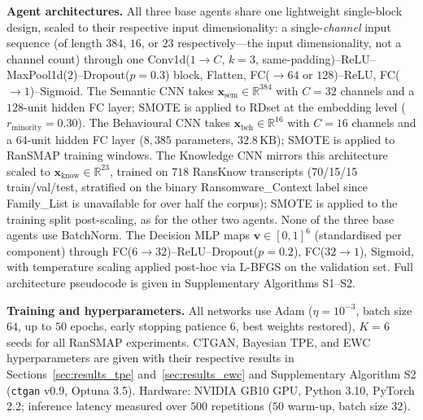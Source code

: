 \documentclass[journal]{IEEEtran}
\newcommand{\R}{\mathbb{R}}
\begin{document}
\textbf{Agent architectures.} All three base agents share one lightweight
single-block design, scaled to their respective input dimensionality: a
single-\emph{channel} input sequence (of length $384$, $16$, or $23$
respectively---the input dimensionality, not a channel count) through one
Conv1d($1{\to}C$, $k{=}3$, same-padding)--ReLU--MaxPool1d($2$)--Dropout($p{=}0.3$)
block, Flatten, FC($\to 64$ or $128$)--ReLU, FC($\to 1$)--Sigmoid. The
Semantic CNN takes $\mathbf{x}_{\text{sem}} \in \R^{384}$ with $C{=}32$
channels and a $128$-unit hidden FC layer; SMOTE is applied to RDset at the
embedding level ($r_{\text{minority}}{=}0.30$). The Behavioural CNN takes
$\mathbf{x}_{\text{beh}} \in \R^{16}$ with $C{=}16$ channels and a $64$-unit
hidden FC layer ($8{,}385$ parameters, $32.8\,\text{KB}$); SMOTE is applied
to RanSMAP training windows. The Knowledge CNN mirrors this architecture
scaled to $\mathbf{x}_{\text{know}} \in \R^{23}$, trained on $718$ RansKnow
transcripts (70/15/15 train/val/test, stratified on the binary
Ransomware\_Context label since Family\_List is unavailable for over half
the corpus); SMOTE is applied to the training split post-scaling, as for
the other two agents. None of the three base agents use BatchNorm. The Decision MLP maps
$\mathbf{v} \in [0,1]^6$ (standardised per component) through
FC($6{\to}32$)--ReLU--Dropout($p{=}0.2$), FC($32{\to}1$), Sigmoid, with
temperature scaling applied post-hoc via L-BFGS on the validation set.
Full architecture pseudocode is given in Supplementary Algorithms S1--S2.

\textbf{Training and hyperparameters.} All networks use Adam
($\eta{=}10^{-3}$, batch size $64$, up to $50$ epochs, early stopping
patience $6$, best weights restored), $K{=}6$ seeds for all RanSMAP
experiments. CTGAN, Bayesian TPE, and EWC hyperparameters are given with
their respective results in Sections~\ref{sec:results_tpe}
and~\ref{sec:results_ewc} and Supplementary Algorithm S2
(\texttt{ctgan} v0.9, Optuna 3.5). Hardware: NVIDIA GB10 GPU, Python
3.10, PyTorch 2.2; inference latency measured over $500$ repetitions
($50$ warm-up, batch size $32$).
\end{document}
